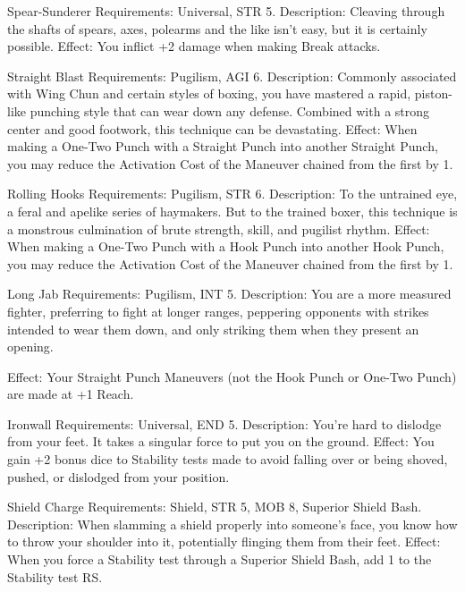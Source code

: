 \documentclass[oneside,11pt,english]{book}
\begin{document}
 

Spear-Sunderer 
Requirements: Universal, STR 5. 
Description: Cleaving through the shafts of spears, axes, polearms and the like isn’t easy, but it is 
certainly possible. 
Effect: You inflict +2 damage when making Break attacks. 

 

Straight Blast 
Requirements: Pugilism, AGI 6. 
Description: Commonly associated with Wing Chun and certain styles of boxing, you have mastered a 
rapid, piston-like punching style that can wear down any defense. Combined with a strong center and 
good footwork, this technique can be devastating. 
Effect: When making a One-Two Punch with a Straight Punch into another Straight Punch, you may 
reduce the Activation Cost of the Maneuver chained from the first by 1. 

 

Rolling Hooks 
Requirements: Pugilism, STR 6. 
Description: To the untrained eye, a feral and apelike series of haymakers. But to the trained boxer, this 
technique is a monstrous culmination of brute strength, skill, and pugilist rhythm. 
Effect: When making a One-Two Punch with a Hook Punch into another Hook Punch, you may reduce 
the Activation Cost of the Maneuver chained from the first by 1. 

 

 

Long Jab 
Requirements: Pugilism, INT 5. 
Description: You are a more measured fighter, preferring to fight at longer ranges, peppering opponents 
with strikes intended to wear them down, and only striking them when they present an opening. 


Effect: Your Straight Punch Maneuvers (not the Hook Punch or One-Two Punch) are made at +1 Reach. 

 

Ironwall 
Requirements: Universal, END 5. 
Description: You’re hard to dislodge from your feet. It takes a singular force to put you on the ground. 
Effect: You gain +2 bonus dice to Stability tests made to avoid falling over or being shoved, pushed, or 
dislodged from your position. 

 

 

Shield Charge 
Requirements: Shield, STR 5, MOB 8, Superior Shield Bash. 
Description: When slamming a shield properly into someone’s face, you know how to throw your 
shoulder into it, potentially flinging them from their feet. 
Effect: When you force a Stability test through a Superior Shield Bash, add 1 to the Stability test RS. 
\end{document}
